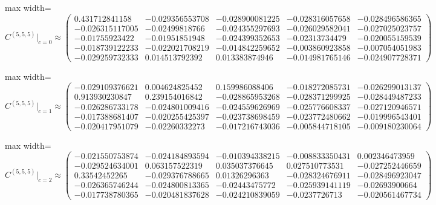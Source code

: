 \begin{center}
\begin{adjustbox}{max width=\linewidth}
\(
C^{(5,5,5)}\big|_{c=0}\approx
\begin{pmatrix}
0.431712841158 & -0.029356553708 & -0.028900081225 & -0.028316057658 & -0.028496586365\\
-0.026315117005 & -0.02499818766 & -0.024355297693 & -0.026029582041 & -0.027025023757\\
-0.01755923422 & -0.01951851948 & -0.024399352653 & -0.02313734479 & -0.020055159539\\
-0.018739122233 & -0.022021708219 & -0.014842259652 & -0.003860923858 & -0.007054051983\\
-0.029259732333 & 0.014513792392 & 0.013383874946 & -0.014981765146 & -0.024907728371
\end{pmatrix}
\)
\end{adjustbox}
\end{center}
\begin{center}
\begin{adjustbox}{max width=\linewidth}
\(
C^{(5,5,5)}\big|_{c=1}\approx
\begin{pmatrix}
-0.029109376621 & 0.004624825452 & 0.159986088406 & -0.018272085731 & -0.026299013137\\
0.913930230847 & 0.239154016842 & -0.028865953268 & -0.028371299925 & -0.028449487233\\
-0.026286733178 & -0.024801009416 & -0.024559626969 & -0.025776608337 & -0.027120946571\\
-0.017388681407 & -0.020255425397 & -0.023738698459 & -0.023772480662 & -0.019996543401\\
-0.020417951079 & -0.02260332273 & -0.017216743036 & -0.005844718105 & -0.009180230064
\end{pmatrix}
\)
\end{adjustbox}
\end{center}
\begin{center}
\begin{adjustbox}{max width=\linewidth}
\(
C^{(5,5,5)}\big|_{c=2}\approx
\begin{pmatrix}
-0.021550753874 & -0.024184893594 & -0.010394338215 & -0.008833350431 & 0.002346473959\\
-0.029524634001 & 0.063157522319 & 0.035037376645 & 0.027510773531 & -0.027252446659\\
0.33542452265 & -0.029376788665 & 0.01326296363 & -0.028324676911 & -0.028496923047\\
-0.026365746244 & -0.024800813365 & -0.02443475772 & -0.025939141119 & -0.02693900664\\
-0.017738780365 & -0.020481837628 & -0.024210839059 & -0.0237726713 & -0.020561467734
\end{pmatrix}
\)
\end{adjustbox}
\end{center}
